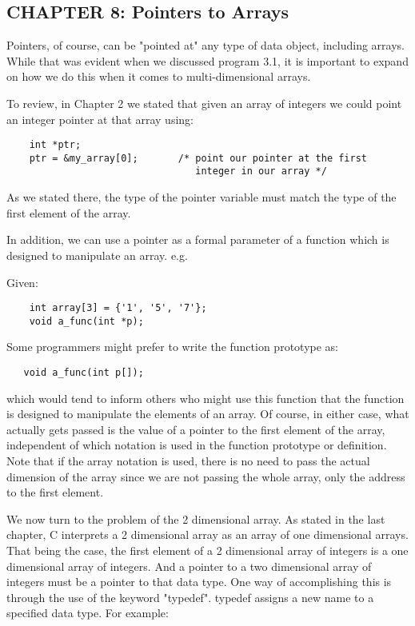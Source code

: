 \hypertarget{chapter-8-pointers-to-arrays}{%
\subsection{CHAPTER 8: Pointers to
Arrays}\label{chapter-8-pointers-to-arrays}}

Pointers, of course, can be "pointed at" any type of data object,
including arrays. While that was evident when we discussed program 3.1,
it is important to expand on how we do this when it comes to
multi-dimensional arrays.

To review, in Chapter 2 we stated that given an array of integers we
could point an integer pointer at that array using:

\begin{verbatim}
    int *ptr;
    ptr = &my_array[0];       /* point our pointer at the first
                                 integer in our array */
\end{verbatim}

As we stated there, the type of the pointer variable must match the type
of the first element of the array.

In addition, we can use a pointer as a formal parameter of a function
which is designed to manipulate an array. e.g.

Given:

\begin{verbatim}
    int array[3] = {'1', '5', '7'};
    void a_func(int *p);
\end{verbatim}

Some programmers might prefer to write the function prototype as:

\begin{verbatim}
   void a_func(int p[]);
\end{verbatim}

which would tend to inform others who might use this function that the
function is designed to manipulate the elements of an array. Of course,
in either case, what actually gets passed is the value of a pointer to
the first element of the array, independent of which notation is used in
the function prototype or definition. Note that if the array notation is
used, there is no need to pass the actual dimension of the array since
we are not passing the whole array, only the address to the first
element.

We now turn to the problem of the 2 dimensional array. As stated in the
last chapter, C interprets a 2 dimensional array as an array of one
dimensional arrays. That being the case, the first element of a 2
dimensional array of integers is a one dimensional array of integers.
And a pointer to a two dimensional array of integers must be a pointer
to that data type. One way of accomplishing this is through the use of
the keyword "typedef". typedef assigns a new name to a specified data
type. For example:

